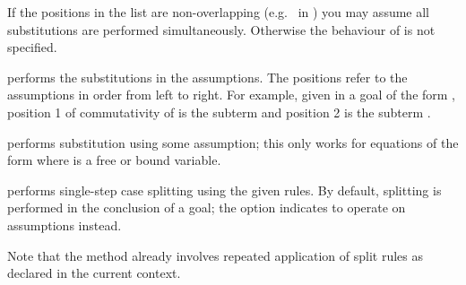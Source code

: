 \begin{isabellebody}
\begin{isamarkuptext}
\begin{descr}
  If the positions in the list  are non-overlapping
  (e.g.\  in ) you may
  assume all substitutions are performed simultaneously.  Otherwise
  the behaviour of  is not specified.

  \item [\hyperlink{method.subst}{\mbox{\isa{subst}}}~\isa{{\isachardoublequote}{\isacharparenleft}asm{\isacharparenright}\ {\isacharparenleft}i\ {\isasymdots}\ j{\isacharparenright}\ eq{\isachardoublequote}}] performs the
  substitutions in the assumptions. The positions refer to the
  assumptions in order from left to right.  For example, given in a
  goal of the form , position 1 of
  commutativity of \isa{{\isachardoublequote}{\isacharplus}{\isachardoublequote}} is the subterm  and
  position 2 is the subterm .

  \item [\hyperlink{method.hypsubst}{\mbox{\isa{hypsubst}}}] performs substitution using some
  assumption; this only works for equations of the form  where  is a free or bound variable.

  \item [\hyperlink{method.split}{\mbox{\isa{split}}}~\isa{{\isachardoublequote}a\isactrlsub {\isadigit{1}}\ {\isasymdots}\ a\isactrlsub n{\isachardoublequote}}] performs
  single-step case splitting using the given rules.  By default,
  splitting is performed in the conclusion of a goal; the  option indicates to operate on assumptions instead.
  
  Note that the \hyperlink{method.simp}{\mbox{}} method already involves repeated
  application of split rules as declared in the current context.


\end{descr}
\end{isamarkuptext}
\end{isabellebody}
